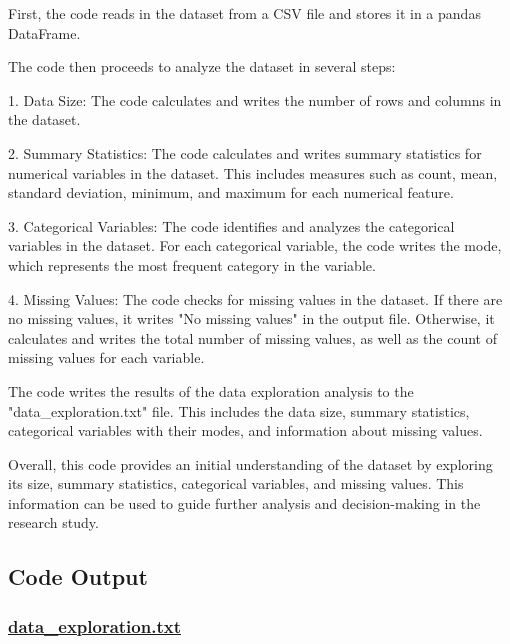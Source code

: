 \documentclass[11pt]{article}
\begin{document}
First, the code reads in the dataset from a CSV file and stores it in a pandas DataFrame. 

The code then proceeds to analyze the dataset in several steps:

1. Data Size: The code calculates and writes the number of rows and columns in the dataset.

2. Summary Statistics: The code calculates and writes summary statistics for numerical variables in the dataset. This includes measures such as count, mean, standard deviation, minimum, and maximum for each numerical feature.

3. Categorical Variables: The code identifies and analyzes the categorical variables in the dataset. For each categorical variable, the code writes the mode, which represents the most frequent category in the variable.

4. Missing Values: The code checks for missing values in the dataset. If there are no missing values, it writes "No missing values" in the output file. Otherwise, it calculates and writes the total number of missing values, as well as the count of missing values for each variable.

The code writes the results of the data exploration analysis to the "data\_exploration.txt" file. This includes the data size, summary statistics, categorical variables with their modes, and information about missing values.

Overall, this code provides an initial understanding of the dataset by exploring its size, summary statistics, categorical variables, and missing values. This information can be used to guide further analysis and decision-making in the research study.

\subsection{Code Output}\hypertarget{file-data-exploration-txt}{}

\subsubsection*{\hyperlink{code-Data Exploration-data-exploration-txt}{data\_exploration.txt}}
\end{document}
